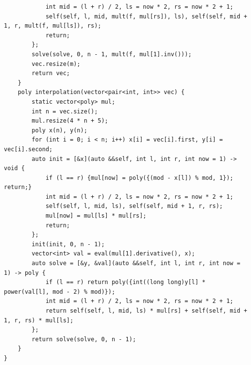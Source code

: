 \begin{verbatim}
            int mid = (l + r) / 2, ls = now * 2, rs = now * 2 + 1;
            self(self, l, mid, mult(f, mul[rs]), ls), self(self, mid + 1, r, mult(f, mul[ls]), rs);
            return;
        };
        solve(solve, 0, n - 1, mult(f, mul[1].inv()));
        vec.resize(m);
        return vec;
    }
    poly interpolation(vector<pair<int, int>> vec) {
        static vector<poly> mul;
        int n = vec.size();
        mul.resize(4 * n + 5);
        poly x(n), y(n);
        for (int i = 0; i < n; i++) x[i] = vec[i].first, y[i] = vec[i].second;
        auto init = [&x](auto &&self, int l, int r, int now = 1) -> void {
            if (l == r) {mul[now] = poly({(mod - x[l]) % mod, 1}); return;}
            int mid = (l + r) / 2, ls = now * 2, rs = now * 2 + 1;
            self(self, l, mid, ls), self(self, mid + 1, r, rs);
            mul[now] = mul[ls] * mul[rs];
            return;
        };
        init(init, 0, n - 1);
        vector<int> val = eval(mul[1].derivative(), x);
        auto solve = [&y, &val](auto &&self, int l, int r, int now = 1) -> poly {
            if (l == r) return poly({int((long long)y[l] * power(val[l], mod - 2) % mod)});
            int mid = (l + r) / 2, ls = now * 2, rs = now * 2 + 1;
            return self(self, l, mid, ls) * mul[rs] + self(self, mid + 1, r, rs) * mul[ls];
        };
        return solve(solve, 0, n - 1);
    }
}
\end{verbatim}